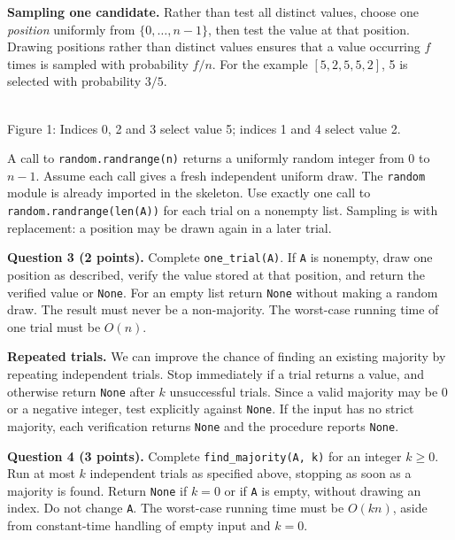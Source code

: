 \documentclass[11pt,a4paper]{article}
\newcommand{\code}[1]{\texttt{#1}}
\newcommand{\q}[2]{\medskip\noindent\textbf{Question #1 (#2 points).} }
\begin{document}
\textbf{Sampling one candidate.} Rather than test all distinct values, choose one \emph{position} uniformly from \(\{0,\ldots,n-1\}\), then test the value at that position. Drawing positions rather than distinct values ensures that a value occurring \(f\) times is sampled with probability \(f/n\). For the example \([5,2,5,5,2]\), 5 is selected with probability \(3/5\).
\newpage
\begin{center}\\[5pt]\small Figure 1: Indices 0, 2 and 3 select value 5; indices 1 and 4 select value 2.
\end{center}
A call to \code{random.randrange(n)} returns a uniformly random integer from \(0\) to \(n-1\). Assume each call gives a fresh independent uniform draw. The \code{random} module is already imported in the skeleton. Use exactly one call to \code{random.randrange(len(A))} for each trial on a nonempty list. Sampling is with replacement: a position may be drawn again in a later trial.

\q{3}{2} Complete \code{one\_trial(A)}. If \code{A} is nonempty, draw one position as described, verify the value stored at that position, and return the verified value or \code{None}. For an empty list return \code{None} without making a random draw. The result must never be a non-majority. The worst-case running time of one trial must be \(O(n)\).

\textbf{Repeated trials.} We can improve the chance of finding an existing majority by repeating independent trials. Stop immediately if a trial returns a value, and otherwise return \code{None} after \(k\) unsuccessful trials. Since a valid majority may be 0 or a negative integer, test explicitly against \code{None}. If the input has no strict majority, each verification returns \code{None} and the procedure reports \code{None}.

\q{4}{3} Complete \code{find\_majority(A, k)} for an integer \(k\ge0\). Run at most \(k\) independent trials as specified above, stopping as soon as a majority is found. Return \code{None} if \(k=0\) or if \code{A} is empty, without drawing an index. Do not change \code{A}. The worst-case running time must be \(O(kn)\), aside from constant-time handling of empty input and \(k=0\).
\end{document}
